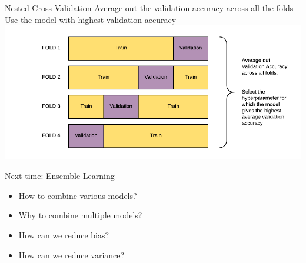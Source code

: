 \documentclass[aspectratio=169,10pt]{beamer}
\newcommand{\fitpic}[1]{\begin{adjustbox}{max width=\linewidth, max totalheight=0.78\textheight}#1\end{adjustbox}}
\begin{document}
	\begin{frame}{Nested Cross Validation}
	Average out the validation accuracy across all the folds\\
	Use the model with highest validation accuracy\\
	\fitpic{\includegraphics[width = \textwidth]{../assets/bias-variance/diagrams/cross-validation-avg}}
	\end{frame}

\begin{frame}{Next time: Ensemble Learning}
\begin{itemize}
	\item How to combine various models?
	\item Why to combine multiple models?
	\item How can we reduce bias?
	\item How can we reduce variance?
\end{itemize}
\end{frame}
\end{document}

